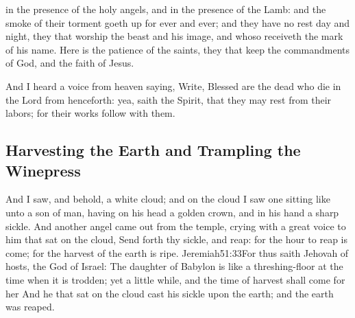  in the presence of the holy angels, and in the presence of the Lamb: 
and the smoke of their torment goeth up for ever and ever;%
 and they have no rest day and night,%
 they that worship the beast and his image, and whoso receiveth the mark of his name. 
Here is the patience of the saints, they that keep the commandments of God, and the faith of Jesus.

And I heard a voice from heaven saying, Write, Blessed are the dead who die in the Lord from henceforth: yea, saith the Spirit, that they may rest from their labors; for their works follow with them.
\subsection*{Harvesting the Earth and Trampling the Winepress}
And I saw, and behold, a white cloud; and on the cloud I saw one sitting like unto a son of man,%
 having on his head a golden crown, and in his hand a sharp sickle. 
And another angel came out from the temple, crying with a great voice to him that sat on the cloud, Send forth thy sickle, and reap: for the hour to reap is come; for the harvest of the earth is ripe.%
				  {Jeremiah}{51:33}{For thus saith Jehovah of hosts, the God of Israel: The daughter of Babylon is like a threshing-floor at the time when it is trodden; yet a little while, and the time of harvest shall come for her}
And he that sat on the cloud cast his sickle upon the earth; and the earth was reaped.

